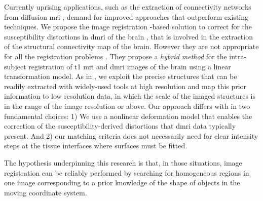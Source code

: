 Currently uprising applications, such as the extraction of connectivity networks from
  diffusion \gls*{mri} \citep{craddock_imaging_2013}, demand for improved approaches
  that outperform existing techniques.
We propose the image registration -based solution to correct for the
  susceptibility distortions in \gls*{dmri} of the brain ,
  that is involved in the extraction of the structural connectivity map of the brain.
However they are not appropriate for all the registration problems
  \citep{greve_accurate_2009}.
They propose a \emph{hybrid method} \citep{sotiras_deformable_2013} for the
  intra-subject registration of \gls*{t1} \gls*{mri} and \gls*{dmri} images
  of the brain using a linear transformation model.
As in \citep{greve_accurate_2009}, we exploit the precise structures that
  can be readily extracted with widely-used tools at high resolution
  and map this prior information to low resolution data,
  in which the scale of the imaged structures is in the range of the image
  resolution or above.
Our approach differs with \citep{greve_accurate_2009} in two fundamental
  choices: 1) We use a nonlinear deformation model that enables the
  correction of the susceptibility-derived distortions
  \citep{jezzard_correction_1995} that \gls*{dmri} data typically present.
And 2) our matching criteria does not necessarily need for clear intensity
  steps at the tissue interfaces where surfaces must be fitted.

The hypothesis underpinning this research is that, in those situations,
  image registration can be reliably performed by searching for homogeneous
  regions in one image corresponding to a prior knowledge of the shape of objects in
  the moving coordinate system.





